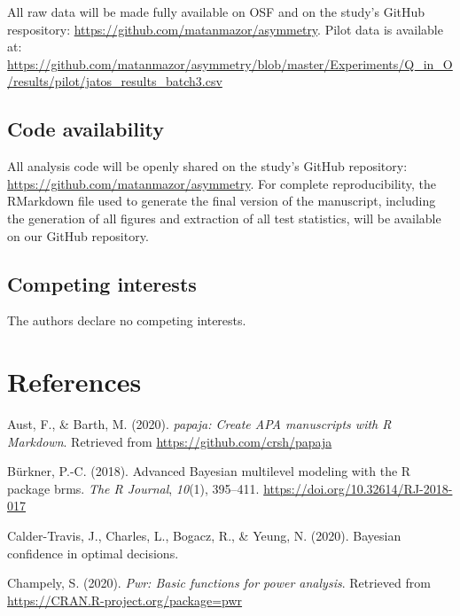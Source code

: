 \documentclass[
  english,
  man,floatsintext]{apa6}
\begin{document}
All raw data will be made fully available on OSF and on the study's GitHub respository: \url{https://github.com/matanmazor/asymmetry}.
Pilot data is available at: \url{https://github.com/matanmazor/asymmetry/blob/master/Experiments/Q_in_O/results/pilot/jatos_results_batch3.csv}

\hypertarget{code-availability}{%
\subsection{Code availability}\label{code-availability}}

All analysis code will be openly shared on the study's GitHub repository: \url{https://github.com/matanmazor/asymmetry}. For complete reproducibility, the RMarkdown file used to generate the final version of the manuscript, including the generation of all figures and extraction of all test statistics, will be available on our GitHub repository.

\hypertarget{competing-interests}{%
\subsection{Competing interests}\label{competing-interests}}

The authors declare no competing interests.

\newpage

\hypertarget{references}{%
\section{References}\label{references}}

\begingroup
\setlength{\parindent}{-0.5in}
\setlength{\leftskip}{0.5in}

\hypertarget{refs}{}
\leavevmode\hypertarget{ref-R-papaja}{}%
Aust, F., \& Barth, M. (2020). \emph{papaja: Create APA manuscripts with R Markdown}. Retrieved from \url{https://github.com/crsh/papaja}

\leavevmode\hypertarget{ref-R-brms_b}{}%
Bürkner, P.-C. (2018). Advanced Bayesian multilevel modeling with the R package brms. \emph{The R Journal}, \emph{10}(1), 395--411. \url{https://doi.org/10.32614/RJ-2018-017}

\leavevmode\hypertarget{ref-calder2020bayesian}{}%
Calder-Travis, J., Charles, L., Bogacz, R., \& Yeung, N. (2020). Bayesian confidence in optimal decisions.

\leavevmode\hypertarget{ref-R-pwr}{}%
Champely, S. (2020). \emph{Pwr: Basic functions for power analysis}. Retrieved from \url{https://CRAN.R-project.org/package=pwr}
\end{document}
